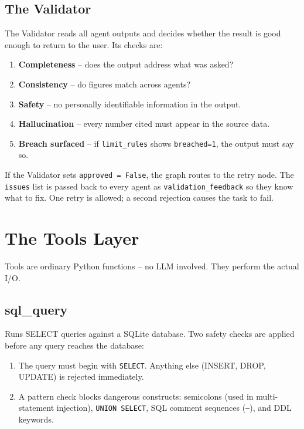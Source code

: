 \documentclass[12pt,a4paper]{article}
\begin{document}
\subsection{The Validator}

The Validator reads all agent outputs and decides whether the result is good enough to return to the user. Its checks are:

\begin{enumerate}
  \item \textbf{Completeness} -- does the output address what was asked?
  \item \textbf{Consistency} -- do figures match across agents?
  \item \textbf{Safety} -- no personally identifiable information in the output.
  \item \textbf{Hallucination} -- every number cited must appear in the source data.
  \item \textbf{Breach surfaced} -- if \texttt{limit\_rules} shows \texttt{breached=1}, the output must say so.
\end{enumerate}

If the Validator sets \texttt{approved = False}, the graph routes to the retry node. The \texttt{issues} list is passed back to every agent as \texttt{validation\_feedback} so they know what to fix. One retry is allowed; a second rejection causes the task to fail.


\section{The Tools Layer}

Tools are ordinary Python functions -- no LLM involved. They perform the actual I/O.

\subsection{sql\_query}

Runs SELECT queries against a SQLite database. Two safety checks are applied before any query reaches the database:

\begin{enumerate}
  \item The query must begin with \texttt{SELECT}. Anything else (INSERT, DROP, UPDATE) is rejected immediately.
  \item A pattern check blocks dangerous constructs: semicolons (used in multi-statement injection), \texttt{UNION SELECT}, SQL comment sequences (\texttt{--}), and DDL keywords.
\end{enumerate}
\end{document}

